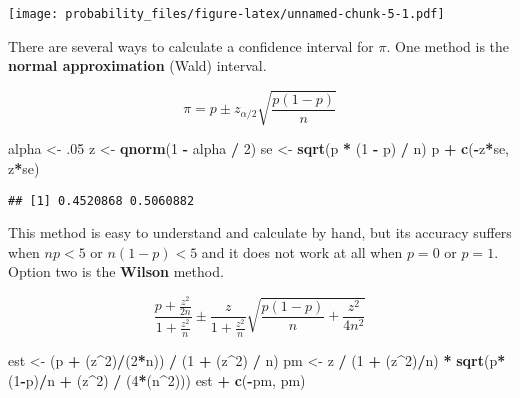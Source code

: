 \documentclass[
]{book}
\newenvironment{Shaded}{\begin{snugshade}}{\end{snugshade}}
\newcommand{\DecValTok}[1]{\textcolor[rgb]{0.00,0.00,0.81}{#1}}
\newcommand{\FloatTok}[1]{\textcolor[rgb]{0.00,0.00,0.81}{#1}}
\newcommand{\KeywordTok}[1]{\textcolor[rgb]{0.13,0.29,0.53}{\textbf{#1}}}
\newcommand{\NormalTok}[1]{#1}
\newcommand{\OperatorTok}[1]{\textcolor[rgb]{0.81,0.36,0.00}{\textbf{#1}}}
\newcommand{\StringTok}[1]{\textcolor[rgb]{0.31,0.60,0.02}{#1}}
\begin{document}
\texttt{[image: probability\_files/figure-latex/unnamed-chunk-5-1.pdf]}

There are several ways to calculate a confidence interval for \(\pi\). One method is the \textbf{normal approximation} (Wald) interval.

\[\pi = p \pm z_{\alpha /2} \sqrt{\frac{p (1 - p)}{n}}\]

\begin{Shaded}
\begin{Highlighting}[]
\NormalTok{alpha <-}\StringTok{ }\FloatTok{.05}
\NormalTok{z <-}\StringTok{ }\KeywordTok{qnorm}\NormalTok{(}\DecValTok{1} \OperatorTok{-}\StringTok{ }\NormalTok{alpha }\OperatorTok{/}\StringTok{ }\DecValTok{2}\NormalTok{)}
\NormalTok{se <-}\StringTok{ }\KeywordTok{sqrt}\NormalTok{(p }\OperatorTok{*}\StringTok{ }\NormalTok{(}\DecValTok{1} \OperatorTok{-}\StringTok{ }\NormalTok{p) }\OperatorTok{/}\StringTok{ }\NormalTok{n)}
\NormalTok{p }\OperatorTok{+}\StringTok{ }\KeywordTok{c}\NormalTok{(}\OperatorTok{-}\NormalTok{z}\OperatorTok{*}\NormalTok{se, z}\OperatorTok{*}\NormalTok{se)}
\end{Highlighting}
\end{Shaded}

\begin{verbatim}
## [1] 0.4520868 0.5060882
\end{verbatim}

This method is easy to understand and calculate by hand, but its accuracy suffers when \(np<5\) or \(n(1-p)<5\) and it does not work at all when \(p = 0\) or \(p = 1\). Option two is the \textbf{Wilson} method.

\[\frac{p + \frac{z^2}{2n}}{1 + \frac{z^2}{n}} \pm \frac{z}{1 + \frac{z^2}{n}} \sqrt{\frac{p(1 - p)}{n} + \frac{z^2}{4n^2}}\]

\begin{Shaded}
\begin{Highlighting}[]
\NormalTok{est <-}\StringTok{ }\NormalTok{(p }\OperatorTok{+}\StringTok{ }\NormalTok{(z}\OperatorTok{^}\DecValTok{2}\NormalTok{)}\OperatorTok{/}\NormalTok{(}\DecValTok{2}\OperatorTok{*}\NormalTok{n)) }\OperatorTok{/}\StringTok{ }\NormalTok{(}\DecValTok{1} \OperatorTok{+}\StringTok{ }\NormalTok{(z}\OperatorTok{^}\DecValTok{2}\NormalTok{) }\OperatorTok{/}\StringTok{ }\NormalTok{n)}
\NormalTok{pm <-}\StringTok{ }\NormalTok{z }\OperatorTok{/}\StringTok{ }\NormalTok{(}\DecValTok{1} \OperatorTok{+}\StringTok{ }\NormalTok{(z}\OperatorTok{^}\DecValTok{2}\NormalTok{)}\OperatorTok{/}\NormalTok{n) }\OperatorTok{*}\StringTok{ }\KeywordTok{sqrt}\NormalTok{(p}\OperatorTok{*}\NormalTok{(}\DecValTok{1}\OperatorTok{-}\NormalTok{p)}\OperatorTok{/}\NormalTok{n }\OperatorTok{+}\StringTok{ }\NormalTok{(z}\OperatorTok{^}\DecValTok{2}\NormalTok{) }\OperatorTok{/}\StringTok{ }\NormalTok{(}\DecValTok{4}\OperatorTok{*}\NormalTok{(n}\OperatorTok{^}\DecValTok{2}\NormalTok{)))}
\NormalTok{est }\OperatorTok{+}\StringTok{ }\KeywordTok{c}\NormalTok{(}\OperatorTok{-}\NormalTok{pm, pm)}
\end{Highlighting}
\end{Shaded}
\end{document}

